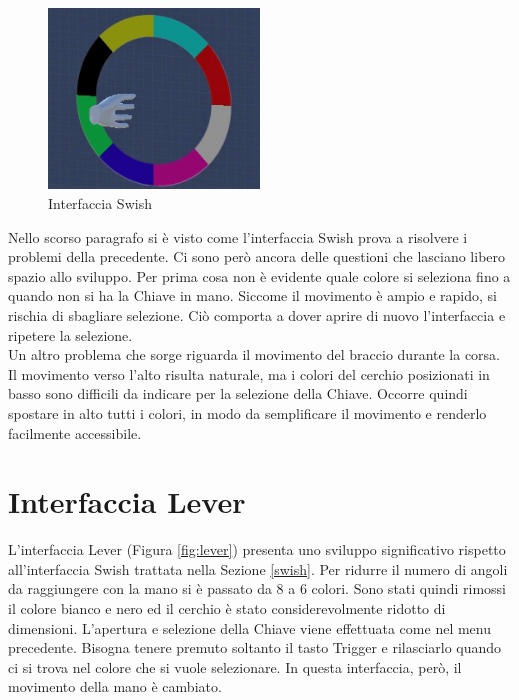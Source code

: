 \documentclass[target=bach,aauheader=]{thud}
\begin{document}
\begin{figure}[h]
    \centering
    \includegraphics[width=0.50\textwidth]{swish}
    \caption{Interfaccia Swish}
    \label{fig:swish}
\end{figure}

Nello scorso paragrafo si è visto come l'interfaccia Swish prova a risolvere i problemi della precedente.
Ci sono però ancora delle questioni che lasciano libero spazio allo sviluppo.
Per prima cosa non è evidente quale colore si seleziona fino a quando non si ha la Chiave in mano.
Siccome il movimento è ampio e rapido, si rischia di sbagliare selezione.
Ciò comporta a dover aprire di nuovo l'interfaccia e ripetere la selezione. \\

Un altro problema che sorge riguarda il movimento del braccio durante la corsa.
Il movimento verso l'alto risulta naturale, ma i colori del cerchio posizionati in basso sono difficili da indicare per la selezione della Chiave.
Occorre quindi spostare in alto tutti i colori, in modo da semplificare il movimento e renderlo facilmente accessibile. 

\section{Interfaccia Lever}
\label{lever}
L'interfaccia Lever (Figura \ref{fig:lever}) presenta uno sviluppo significativo rispetto all'interfaccia Swish trattata nella Sezione \ref{swish}.
Per ridurre il numero di angoli da raggiungere con la mano si è passato da 8 a 6 colori. 
Sono stati quindi rimossi il colore bianco e nero ed il cerchio è stato considerevolmente ridotto di dimensioni.
L'apertura e selezione della Chiave viene effettuata come nel menu precedente.
Bisogna tenere premuto soltanto il tasto Trigger e rilasciarlo quando ci si trova nel colore che si vuole selezionare.
In questa interfaccia, però, il movimento della mano è cambiato. \\
\end{document}
